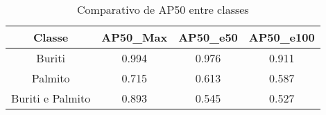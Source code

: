 \begin{table}[H]
\centering
\caption{Comparativo de AP50 entre classes}
\label{tab:resultados_ap50}
\begin{tabular}{c|c|c|c}
\toprule
\textbf{Classe} & \textbf{AP50\_Max} & \textbf{AP50\_e50}  & \textbf{AP50\_e100}\\
\midrule
Buriti & 0.994 & 0.976 & 0.911 \\
Palmito & 0.715 & 0.613 & 0.587 \\
\midrule
Buriti e Palmito & 0.893 & 0.545 & 0.527 \\
 \bottomrule

\end{tabular}
\end{table}